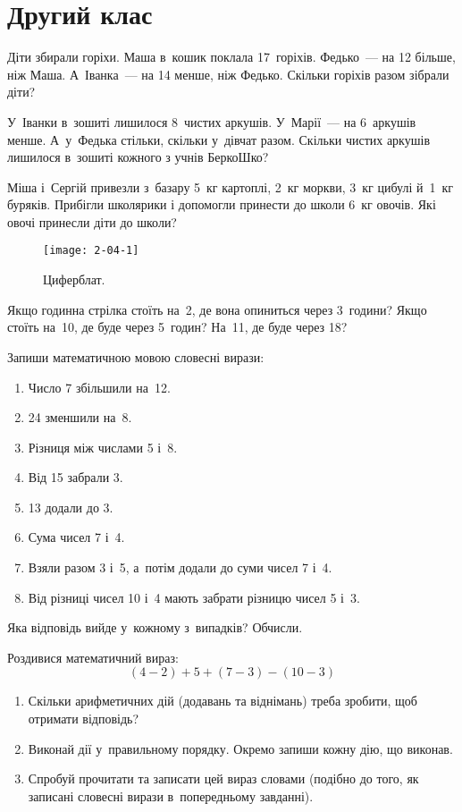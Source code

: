 \chapter{Другий клас}

\problem
Діти збирали горіхи. Маша в~кошик поклала 17~горіхів.
Федько~--- на 12 більше, ніж Маша. А~Іванка~--- на 14 менше, ніж Федько.
Скільки горіхів разом зібрали діти?


\problem
У~Іванки в~зошиті лишилося 8~чистих аркушів.
У~Марії~--- на 6~аркушів менше.
А~у~Федька стільки, скільки у~дівчат разом.
Скільки чистих аркушів лишилося в~зошиті кожного з учнів БеркоШко?


\problem
Міша і~Сергій привезли з~базару 5~кг картоплі, 2~кг моркви,
3~кг цибулі й~1~кг буряків.
Прибігли школярики і допомогли принести до школи 6~кг овочів.
Які овочі принесли діти до школи?


\problem
{}

\begin{figure}[ht]
  \centering
  \texttt{[image: 2-04-1]}
  \caption{Циферблат.}
  \label{fig:clockface}
\end{figure}

Якщо годинна стрілка стоїть на~2, де вона опиниться через 3~години?
Якщо стоїть на~10, де буде через 5~годин?
На~11, де буде через 18?


\problem
Запиши математичною мовою словесні вирази:
\begin{enumerate}
  \item Число 7 збільшили на~12.
  \item 24 зменшили на~8.
  \item Різниця між числами 5 і~8.
  \item Від 15 забрали 3.
  \item 13 додали до 3.
  \item Сума чисел 7 і~4.
  \item Взяли разом 3 і~5, а~потім додали до суми чисел 7 і~4.
  \item Від різниці чисел 10 і~4 мають забрати різницю чисел 5 і~3.
\end{enumerate}
Яка відповідь вийде у~кожному з~випадків? Обчисли.


\problem
Роздивися математичний вираз:
\[
  (4 - 2) + 5 + (7 - 3) - (10 - 3)
\]
\begin{enumerate}
  \item Скільки арифметичних дій (додавань та віднімань)
  треба зробити, щоб отримати відповідь?
  \item Виконай дії у~правильному порядку.
  Окремо запиши кожну дію, що виконав.
  \item Спробуй прочитати та записати цей вираз словами
  (подібно до того, як записані словесні вирази в~попередньому завданні).
\end{enumerate}


